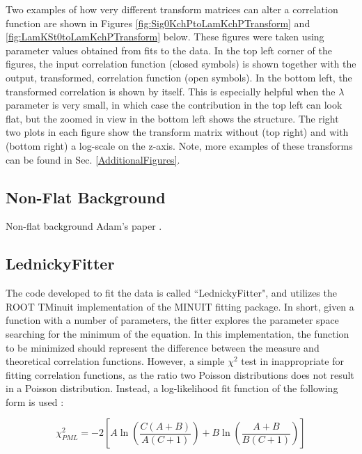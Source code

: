 \documentclass[ALICE,manyauthors]{cernphprep}
\begin{document}
Two examples of how very different transform matrices can alter a correlation function are shown in Figures \ref{fig:Sig0KchPtoLamKchPTransform} and \ref{fig:LamKSt0toLamKchPTransform} below.  These figures were taken using parameter values obtained from fits to the data.  In the top left corner of the figures, the input correlation function (closed symbols) is shown together with the output, transformed, correlation function (open symbols).  In the bottom left, the transformed correlation is shown by itself.  This is especially helpful when the $\lambda$ parameter is very small, in which case the contribution in the top left can look flat, but the zoomed in view in the bottom left shows the structure.  The right two plots in each figure show the transform matrix without (top right) and with (bottom right) a log-scale on the z-axis.  Note, more examples of these transforms can be found in Sec. \ref{AdditionalFigures}.




\subsection{Non-Flat Background}
\label{NonFlatBackground}


Non-flat background
Adam's paper \cite{Kisiel:2017}.




\subsection{LednickyFitter}
\label{LednickyFitter}


The code developed to fit the data is called ``LednickyFitter", and utilizes the ROOT TMinuit implementation of the MINUIT fitting package.
In short, given a function with a number of parameters, the fitter explores the parameter space searching for the minimum of the equation.
In this implementation, the function to be minimized should represent the difference between the measure and theoretical correlation functions.
However, a simple $\chi^{2}$ test in inappropriate for fitting correlation functions, as the ratio two Poisson distributions does not result in a Poisson distribution.
Instead, a log-likelihood fit function of the following form is used \cite{Lisa:2005dd}:

\begin{equation}
 \chi^{2}_{PML} = -2\left[A\ln\left(\frac{C(A+B)}{A(C+1)}\right) + B\ln\left(\frac{A+B}{B(C+1)}\right)\right]
\label{eqn:Chi2PML}
\end{equation}
\end{document}
